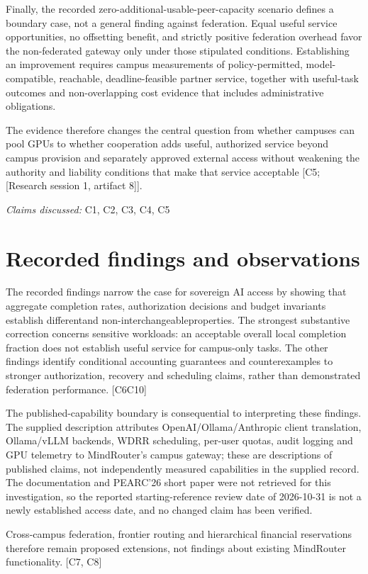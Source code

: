 \documentclass[11pt]{article}
\begin{document}
Finally, the recorded zero-additional-usable-peer-capacity scenario defines a boundary case, not a general finding against federation. Equal useful service opportunities, no offsetting benefit, and strictly positive federation overhead favor the non-federated gateway only under those stipulated conditions. Establishing an improvement requires campus measurements of policy-permitted, model-compatible, reachable, deadline-feasible partner service, together with useful-task outcomes and non-overlapping cost evidence that includes administrative obligations.

The evidence therefore changes the central question from whether campuses can pool GPUs to whether cooperation adds useful, authorized service beyond campus provision and separately approved external access without weakening the authority and liability conditions that make that service acceptable [C5; [Research session 1, artifact 8]].

\textit{Claims discussed: }C1, C2, C3, C4, C5
\section{Recorded findings and observations}
The recorded findings narrow the case for sovereign AI access by showing that aggregate completion rates, authorization decisions and budget invariants establish different\textemdash{}and non-interchangeable\textemdash{}properties. The strongest substantive correction concerns sensitive workloads: an acceptable overall local completion fraction does not establish useful service for campus-only tasks. The other findings identify conditional accounting guarantees and counterexamples to stronger authorization, recovery and scheduling claims, rather than demonstrated federation performance. [C6\textendash{}C10]

The published-capability boundary is consequential to interpreting these findings. The supplied description attributes OpenAI/Ollama/Anthropic client translation, Ollama/vLLM backends, WDRR scheduling, per-user quotas, audit logging and GPU telemetry to MindRouter\textquoteright{}s campus gateway; these are descriptions of published claims, not independently measured capabilities in the supplied record. The documentation and PEARC\textquoteright{}26 short paper were not retrieved for this investigation, so the reported starting-reference review date of 2026-10-31 is not a newly established access date, and no changed claim has been verified.

Cross-campus federation, frontier routing and hierarchical financial reservations therefore remain proposed extensions, not findings about existing MindRouter functionality. [C7, C8]
\end{document}
